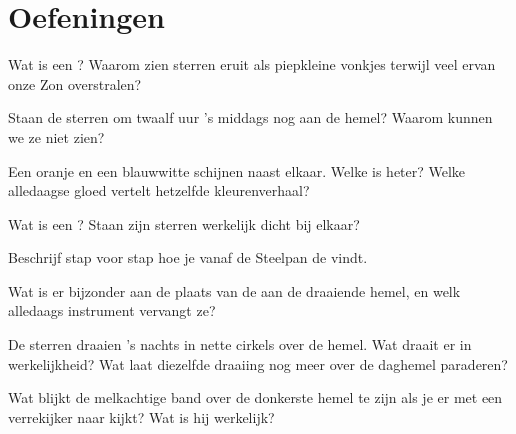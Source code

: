 \section{Oefeningen}

\begin{exercise}[$\star$]\label{exo:g5:stars-night-sky:1}
Wat is een ? Waarom zien sterren eruit als piepkleine vonkjes
terwijl veel ervan onze Zon overstralen?
\end{exercise}

\begin{exercise}[$\star$]\label{exo:g5:stars-night-sky:2}
Staan de sterren om twaalf uur 's middags nog aan de hemel? Waarom
kunnen we ze niet zien?
\end{exercise}

\begin{exercise}[$\star$]\label{exo:g5:stars-night-sky:3}
Een oranje  en een blauwwitte  schijnen naast elkaar. Welke
is heter? Welke alledaagse gloed vertelt hetzelfde kleurenverhaal?
\end{exercise}

\begin{exercise}[$\star$]\label{exo:g5:stars-night-sky:4}
Wat is een ? Staan zijn sterren werkelijk dicht bij
elkaar?
\end{exercise}

\begin{exercise}[$\star$]\label{exo:g5:stars-night-sky:5}
Beschrijf stap voor stap hoe je vanaf de Steelpan de  vindt.
\end{exercise}

\begin{exercise}[$\star$]\label{exo:g5:stars-night-sky:6}
Wat is er bijzonder aan de plaats van de  aan de draaiende
hemel, en welk alledaags instrument vervangt ze?
\end{exercise}

\begin{exercise}[$\star$]\label{exo:g5:stars-night-sky:7}
De sterren draaien 's nachts in nette cirkels over de hemel. Wat
draait er in werkelijkheid? Wat laat diezelfde draaiing nog meer over
de daghemel paraderen?
\end{exercise}

\begin{exercise}[$\star$]\label{exo:g5:stars-night-sky:8}
Wat blijkt de melkachtige band over de donkerste hemel te zijn als je
er met een verrekijker naar kijkt? Wat is hij werkelijk?
\end{exercise}

